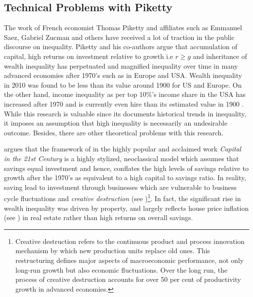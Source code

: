 \documentclass[12pt]{article}
\newcommand{\1}{\mathbbm 1}
\begin{document}
		
		
		
		\subsection{Technical Problems with Piketty} 
		
		
		The work of French economist Thomas Piketty and affiliates such as Emmanuel Saez, Gabriel Zucman and others have received a lot of traction in the public discourse on inequality. Piketty and his co-authors argue that accumulation of capital, high returns on investment relative to growth i.e $r \geq g$ and inheritance of wealth inequality has perpetuated and magnified inequality over time in many advanced economies after 1970's such as in Europe and USA. Wealth inequality in 2010 was found to be less than its value around 1900 for US and Europe. On the other hand, income inequality as per top 10\%'s income share in the USA has increased after 1970 and is currently even hire than its estimated value in 1900 \cite{chancel2022world}. While this research is valuable since its documents historical trends in inequality, it imposes an assumption that high inequality is necessarily an undesirable outcome. Besides, there are other theoretical problems with this research.
		
		
		\cite{soskice2014capital} argues that the framework of \cite{piketty2017capital} in the highly popular and acclaimed work \textit{Capital in the 21st Century} is a highly stylized, neoclassical model which assumes that savings equal investment and hence, conflates the high levels of savings relative to growth after the 1970's as equivalent to a high capital to savings ratio. In reality, saving lead to investment through businesses which are vulnerable to business cycle fluctuations and \textit{creative destruction} (see \cite{schumpeter1942})\footnote{Creative destruction refers to the continuous product and process innovation mechanism by which new production units replace old ones. This restructuring defines major aspects of macroeconomic performance, not only long-run growth but also economic fluctuations. Over the long run, the process of creative destruction accounts for over 50 per cent of productivity growth in advanced economies.}. In fact, the significant rise in wealth inequality was driven by property, and largely reflects house price inflation (see \cite{bonnet2014does}) in real estate rather than high returns on overall savings.
		
\end{document}
